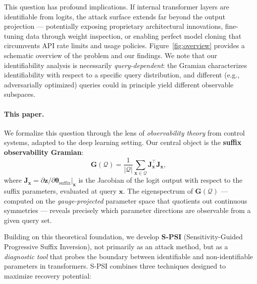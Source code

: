 \documentclass{article}
\newcommand{\cQ}{\mathcal{Q}}
\newcommand{\btheta}{\boldsymbol{\theta}}
\newcommand{\bz}{\mathbf{z}}
\newcommand{\bx}{\mathbf{x}}
\newcommand{\bJ}{\mathbf{J}}
\newcommand{\bG}{\mathbf{G}}
\begin{document}
This question has profound implications. If internal transformer layers are identifiable from logits, the attack surface extends far beyond the output projection --- potentially exposing proprietary architectural innovations, fine-tuning data through weight inspection, or enabling perfect model cloning that circumvents API rate limits and usage policies.  Figure~\ref{fig:overview} provides a schematic overview of the problem and our findings.  We note that our identifiability analysis is necessarily \emph{query-dependent}: the Gramian characterizes identifiability with respect to a specific query distribution, and different (e.g., adversarially optimized) queries could in principle yield different observable subspaces.

\paragraph{This paper.} We formalize this question through the lens of \emph{observability theory} from control systems, adapted to the deep learning setting. Our central object is the \textbf{suffix observability Gramian}:
\begin{equation}\label{eq:gramian-intro}
    \bG(\cQ) = \frac{1}{|\cQ|}\sum_{\bx \in \cQ} \bJ_{\bx}^\top \bJ_{\bx},
\end{equation}
where $\bJ_{\bx} = \partial \bz / \partial \btheta_{\text{suffix}} \big|_{\bx}$ is the Jacobian of the logit output with respect to the suffix parameters, evaluated at query $\bx$. The eigenspectrum of $\bG(\cQ)$ --- computed on the \emph{gauge-projected} parameter space that quotients out continuous symmetries --- reveals precisely which parameter directions are observable from a given query set.

Building on this theoretical foundation, we develop \textbf{S-PSI} (Sensitivity-Guided Progressive Suffix Inversion), not primarily as an attack method, but as a \emph{diagnostic tool} that probes the boundary between identifiable and non-identifiable parameters in transformers.  S-PSI combines three techniques designed to maximize recovery potential:
\end{document}
